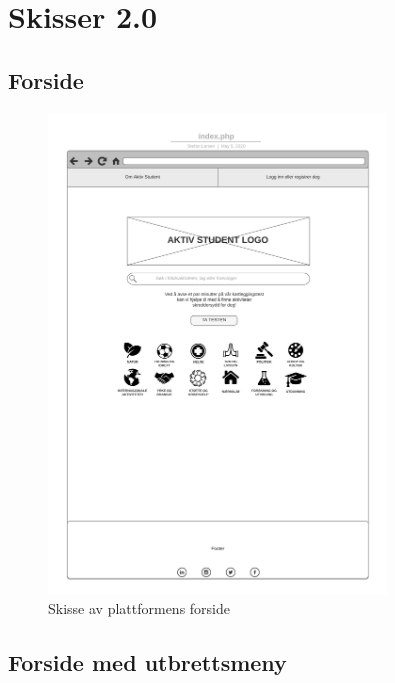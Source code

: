 \chapter{Skisser 2.0}
\label{vedlegg:skisser2}

\section{Forside}

\begin{figure}[H]
\centering
\includegraphics[width=0.8\textwidth]{Illustrasjoner/Skisser/2.0/2-1-forside.png}
\caption{Skisse av plattformens forside}
\label{vedlegg:2-1-forside}
\end{figure}

\section{Forside med utbrettsmeny}

